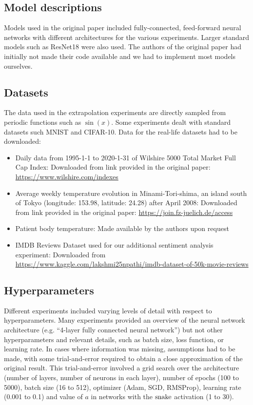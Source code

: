 \subsection{Model descriptions}

Models used in the original paper included fully-connected, feed-forward neural networks with different architectures for the various experiments. Larger standard models such as ResNet18 were also used. The authors of the original paper had initially not made their code available and we had to implement most models ourselves.

\subsection{Datasets}

The data used in the extrapolation experiments are directly sampled from periodic functions such as $\sin(x)$. Some experiments dealt with standard datasets such MNIST and CIFAR-10.
Data for the real-life datasets had to be downloaded:
\begin{itemize}

    \item Daily data from 1995-1-1 to 2020-1-31 of Wilshire 5000 Total Market Full Cap Index: Downloaded from link provided in the original paper: \url{https://www.wilshire.com/indexes}
    \item Average weekly temperature evolution in Minami-Tori-shima, an island south of Tokyo (longitude: 153.98, latitude: 24.28) after April 2008: Downloaded from link provided in the original paper: \url{https://join.fz-juelich.de/access}
    \item Patient body temperature: Made available by the authors upon request
    \item IMDB Reviews Dataset used for our additional sentiment analysis experiment: Downloaded from \url{https://www.kaggle.com/lakshmi25npathi/imdb-dataset-of-50k-movie-reviews}


\end{itemize}

\subsection{Hyperparameters}

Different experiments included varying levels of detail with respect to hyperparameters. Many experiments provided an overview of the neural network architecture (e.g. ``4-layer fully connected neural network'') but not other hyperparameters and relevant details, such as batch size, loss function, or learning rate. In cases where information was missing, assumptions had to be made, with some trial-and-error required to obtain a close approximation of the original result. This trial-and-error involved a grid search over the architecture (number of layers, number of neurons in each layer), number of epochs (100 to 5000), batch size (16 to 512), optimizer (Adam, SGD, RMSProp), learning rate (0.001 to 0.1) and value of $a$ in networks with the $ \operatorname{snake} $ activation (1 to 30).


